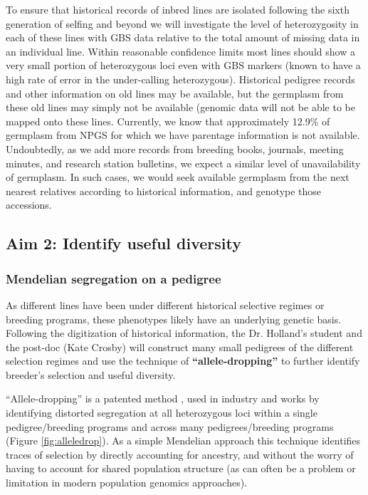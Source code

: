 \documentclass[12pt]{article}
\begin{document}
{To ensure that historical records of inbred lines are isolated following the sixth generation of selfing and beyond we will investigate the level of heterozygosity in each of these lines with GBS data relative to the total amount of missing data in an individual line. 
Within reasonable confidence limits most lines should show a very small portion of heterozygous loci even with GBS markers (known to have a high rate of error in the under-calling heterozygous). 
Historical pedigree records and other information on old lines may be available, but the germplasm from these old lines may simply not be available (genomic data will not be able to be mapped onto these lines. 
Currently, we know that approximately 12.9\% of germplasm from NPGS for which we have parentage information is not available. 
Undoubtedly, as we add more records from breeding books, journals, meeting minutes, and research station bulletins, we expect a similar level of unavailability of germplasm.  
In such cases, we would seek available germplasm from the next nearest relatives according to historical information, and genotype those accessions. 

\subsection*{Aim 2: Identify useful diversity}

\subsubsection*{Mendelian segregation on a pedigree}
As different lines have been under different historical selective regimes or breeding programs, these phenotypes likely have an underlying genetic basis. Following the digitization of historical information, the Dr. Holland's student and the post-doc (Kate Crosby) will construct many small pedigrees of the different selection regimes and use the technique of \textbf{``allele-dropping''} to further identify breeder's selection and useful diversity. 

``Allele-dropping'' is a patented method \citep{sebastian1995method}, used in industry and works by identifying distorted segregation at all heterozygous loci within a single pedigree/breeding programs and across many pedigrees/breeding programs (Figure \ref{fig:alleledrop}). 
As a simple Mendelian approach this technique identifies traces of selection by directly accounting for ancestry, and without the worry of having to account for shared population structure \cite{sebastian1995method} (as can often be a problem or limitation in modern population genomics approaches). 

}
\end{document}
